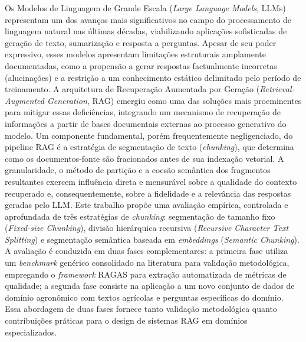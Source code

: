 \documentclass[
	12pt,				%
	openright,			%
	oneside,			%
	a4paper,			%
	tccpreliminar,		%
	]{ABNT-DC-UEL}
\begin{document}
\begin{resumo}
Os Modelos de Linguagem de Grande Escala (\textit{Large Language Models}, LLMs) representam um dos avanços mais significativos no campo do processamento de linguagem natural nas últimas décadas, viabilizando aplicações sofisticadas de geração de texto, sumarização e resposta a perguntas. Apesar de seu poder expressivo, esses modelos apresentam limitações estruturais amplamente documentadas, como a propensão a gerar respostas factualmente incorretas (alucinações) e a restrição a um conhecimento estático delimitado pelo período de treinamento. A arquitetura de Recuperação Aumentada por Geração (\textit{Retrieval-Augmented Generation}, RAG) emergiu como uma das soluções mais proeminentes para mitigar essas deficiências, integrando um mecanismo de recuperação de informações a partir de bases documentais externas ao processo generativo do modelo. Um componente fundamental, porém frequentemente negligenciado, do pipeline RAG é a estratégia de segmentação de texto (\textit{chunking}), que determina como os documentos-fonte são fracionados antes de sua indexação vetorial. A granularidade, o método de partição e a coesão semântica dos fragmentos resultantes exercem influência direta e mensurável sobre a qualidade do contexto recuperado e, consequentemente, sobre a fidelidade e a relevância das respostas geradas pelo LLM. Este trabalho propõe uma avaliação empírica, controlada e aprofundada de três estratégias de \textit{chunking}: segmentação de tamanho fixo (\textit{Fixed-size Chunking}), divisão hierárquica recursiva (\textit{Recursive Character Text Splitting}) e segmentação semântica baseada em \textit{embeddings} (\textit{Semantic Chunking}). A avaliação é conduzida em duas fases complementares: a primeira fase utiliza um \textit{benchmark} genérico consolidado na literatura para validação metodológica, empregando o \textit{framework} RAGAS para extração automatizada de métricas de qualidade; a segunda fase consiste na aplicação a um novo conjunto de dados de domínio agronômico com textos agrícolas e perguntas específicas do domínio. Essa abordagem de duas fases fornece tanto validação metodológica quanto contribuições práticas para o design de sistemas RAG em domínios especializados.
\end{resumo}
\end{document}
